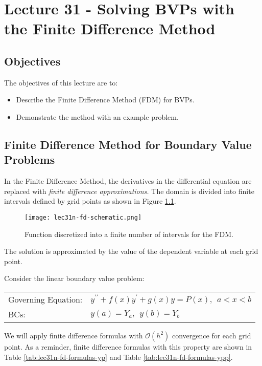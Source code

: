 \chapter{Lecture 31 - Solving BVPs with the Finite Difference Method}
\label{ch:lec31n}
\section{Objectives}
The objectives of this lecture are to:
\begin{itemize}
\item Describe the Finite Difference Method (FDM) for BVPs.
\item Demonstrate the method with an example problem.
\end{itemize}
\setcounter{lstannotation}{0}

\section{Finite Difference Method for Boundary Value Problems}

In the Finite Difference Method, the derivatives in the differential equation are replaced with \emph{finite difference approximations.}  The domain is divided into finite intervals defined by grid points as shown in Figure \ref{fig:lec31-fd-schematic}.
\begin{figure}[h!]
\texttt{[image: lec31n-fd-schematic.png]}
\caption{Function discretized into a finite number of intervals for the FDM.}
\label{fig:lec31-fd-schematic}
\end{figure}
The solution is approximated by the value of the dependent variable at each grid point.  

\vspace{1.0cm}

\noindent Consider the linear boundary value problem:

\begin{table}
\begin{tabular}{l l}
Governing Equation: & $y^{\prime \prime} + f(x)y^{\prime} + g(x)y = P(x), \ \ a < x < b$ \\
BCs: & $y(a) = Y_a, \ \ y(b) = Y_b$ \\
\end{tabular}
\end{table}

\vspace{0.25cm}

\noindent We will apply finite difference formulas with $\mathcal{O}(h^2)$ convergence for each grid point.  As a reminder, finite difference formulas with this property are shown in Table \ref{tab:lec31n-fd-formulas-yp} and Table \ref{tab:lec31n-fd-formulas-ypp}.

